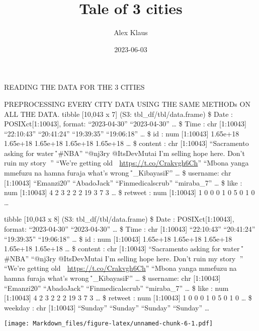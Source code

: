 \documentclass[
]{article}
\title{Tale of 3 cities}
\author{Alex Klaus}
\date{2023-06-03}
\begin{document}
\maketitle

{
\setcounter{tocdepth}{3}
\tableofcontents
}
READING THE DATA FOR THE 3 CITIES

PREPROCESSING EVERY CITY DATA USING THE SAME METHODs ON ALL THE DATA.
tibble {[}10,043 x 7{]} (S3: tbl\_df/tbl/data.frame) \$ Date :
POSIXct{[}1:10043{]}, format: ``2023-04-30'' ``2023-04-30'' \ldots{} \$
Time : chr {[}1:10043{]} ``22:10:43'' ``20:41:24'' ``19:39:35''
``19:06:18'' \ldots{} \$ id : num {[}1:10043{]} 1.65e+18 1.65e+18
1.65e+18 1.65e+18 1.65e+18 \ldots{} \$ content : chr {[}1:10043{]}
``Sacramento asking for water 🤣\r\n\r\n\#NBA'' ``@nj3ry @ItsDevMutai
I'm selling hope here. Don't ruin my story 🤣'' ``We're getting old 🤣
\url{https://t.co/Crakvgh6Ch}'' ``Mbona yanga mmefuzu na hamna furaja
what's wrong 🤣\r\n\r\n@Hon\_KibayasiF'' \ldots{} \$ username: chr
{[}1:10043{]} ``Emanzi20'' ``AbadoJack'' ``Finmedicalscrub''
``miraba\_7'' \ldots{} \$ like : num {[}1:10043{]} 4 2 3 2 2 2 19 3 7 3
\ldots{} \$ retweet : num {[}1:10043{]} 1 0 0 0 1 0 5 0 1 0 \ldots{}

tibble {[}10,043 x 8{]} (S3: tbl\_df/tbl/data.frame) \$ Date :
POSIXct{[}1:10043{]}, format: ``2023-04-30'' ``2023-04-30'' \ldots{} \$
Time : chr {[}1:10043{]} ``22:10:43'' ``20:41:24'' ``19:39:35''
``19:06:18'' \ldots{} \$ id : num {[}1:10043{]} 1.65e+18 1.65e+18
1.65e+18 1.65e+18 1.65e+18 \ldots{} \$ content : chr {[}1:10043{]}
``Sacramento asking for water 🤣\r\n\r\n\#NBA'' ``@nj3ry @ItsDevMutai
I'm selling hope here. Don't ruin my story 🤣'' ``We're getting old 🤣
\url{https://t.co/Crakvgh6Ch}'' ``Mbona yanga mmefuzu na hamna furaja
what's wrong 🤣\r\n\r\n@Hon\_KibayasiF'' \ldots{} \$ username: chr
{[}1:10043{]} ``Emanzi20'' ``AbadoJack'' ``Finmedicalscrub''
``miraba\_7'' \ldots{} \$ like : num {[}1:10043{]} 4 2 3 2 2 2 19 3 7 3
\ldots{} \$ retweet : num {[}1:10043{]} 1 0 0 0 1 0 5 0 1 0 \ldots{} \$
weekday : chr {[}1:10043{]} ``Sunday'' ``Sunday'' ``Sunday'' ``Sunday''
\ldots{}

\texttt{[image: Markdown\_files/figure-latex/unnamed-chunk-6-1.pdf]}
\end{document}
